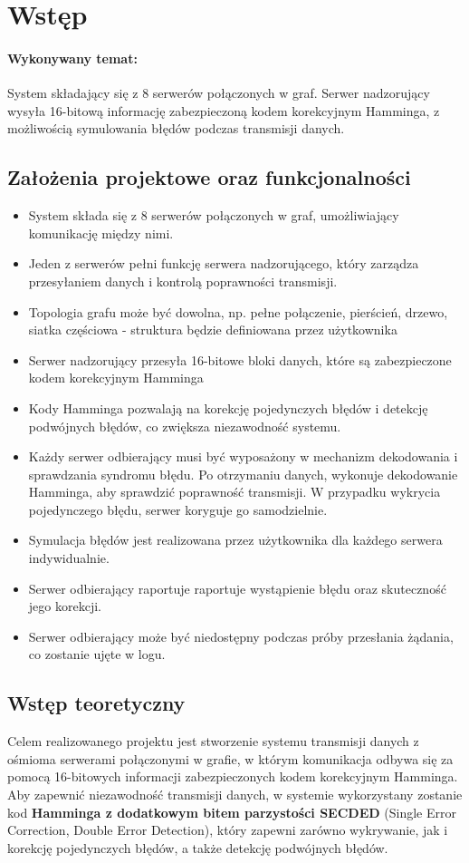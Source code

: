 \section{Wstęp}
\paragraph{Wykonywany temat:} System składający się z 8 serwerów połączonych w graf. Serwer nadzorujący wysyła 16-bitową informację zabezpieczoną kodem korekcyjnym Hamminga, z możliwością symulowania błędów podczas transmisji danych.

\subsection{Założenia projektowe oraz funkcjonalności}
\begin{itemize}
	\item System składa się z 8 serwerów połączonych w graf, umożliwiający komunikację między nimi.
	\item Jeden z serwerów pełni funkcję serwera nadzorującego, który zarządza przesyłaniem danych i kontrolą poprawności transmisji.
	\item Topologia grafu może być dowolna, np. pełne połączenie, pierścień, drzewo, siatka częściowa - struktura będzie definiowana przez użytkownika
	\item Serwer nadzorujący przesyła 16-bitowe bloki danych, które są zabezpieczone kodem korekcyjnym Hamminga 
	\item Kody Hamminga pozwalają na korekcję pojedynczych błędów i detekcję podwójnych błędów, co zwiększa niezawodność systemu.
	\item Każdy serwer odbierający musi być wyposażony w mechanizm dekodowania i sprawdzania syndromu błędu. Po otrzymaniu danych, wykonuje dekodowanie Hamminga, aby sprawdzić poprawność transmisji. W przypadku wykrycia pojedynczego błędu, serwer koryguje go samodzielnie.
	\item Symulacja błędów jest realizowana przez użytkownika dla każdego serwera indywidualnie.
	\item Serwer odbierający raportuje raportuje wystąpienie błędu oraz skuteczność jego korekcji.
	\item Serwer odbierający może być niedostępny podczas próby przesłania żądania, co zostanie ujęte w logu.
\end{itemize}

\subsection{Wstęp teoretyczny}
Celem realizowanego projektu jest stworzenie systemu transmisji danych z ośmioma serwerami połączonymi w grafie, w którym komunikacja odbywa się za pomocą 16-bitowych informacji zabezpieczonych kodem korekcyjnym Hamminga. Aby zapewnić niezawodność transmisji danych, w systemie wykorzystany zostanie kod \textbf{Hamminga z dodatkowym bitem parzystości SECDED} (Single Error Correction, Double Error Detection), który zapewni zarówno wykrywanie, jak i korekcję pojedynczych błędów, a także detekcję podwójnych błędów. 

